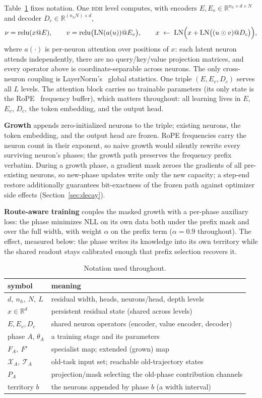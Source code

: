 \documentclass[11pt]{article}
\theoremstyle{definition}\newtheorem{definition}{Definition}
\theoremstyle{remark}\newtheorem{remark}{Remark}
\newcommand{\BDH}{\textsc{bdh}}
\newcommand{\Xa}{\mathcal{X}_A}
\newcommand{\TA}{\mathcal{T}_A}
\begin{document}
Table~\ref{tab:notation} fixes notation. One \BDH{} level computes, with encoders
$E,E_v\in\mathbb{R}^{n_h\times d\times N}$ and decoder $D_c\in\mathbb{R}^{(n_hN)\times d}$,
\[
\nu=\operatorname{relu}(x@E),\qquad
v=\operatorname{relu}\bigl(\operatorname{LN}(a(u))@E_v\bigr),\qquad
x \;\leftarrow\; \operatorname{LN}\Bigl(x+\operatorname{LN}\bigl((u\odot v)@D_c\bigr)\Bigr),
\]
where $a(\cdot)$ is per-neuron attention over positions of $x$: each latent neuron attends
independently, there are no query/key/value projection matrices, and every operator above is
coordinate-separable across neurons. The only cross-neuron coupling is LayerNorm's~\cite{layernorm} global
statistics. One triple $(E,E_v,D_c)$ serves all $L$ levels. The attention block carries no
trainable parameters (its only state is the RoPE~\cite{rope} frequency buffer), which matters throughout:
all learning lives in $E$, $E_v$, $D_c$, the token embedding, and the output head.

\textbf{Growth} appends zero-initialized neurons to the triple; existing neurons, the token
embedding, and the output head are frozen. RoPE frequencies carry the neuron count in their
exponent, so naive growth would silently rewrite every surviving neuron's phases; the
growth path preserves the frequency prefix verbatim. During a growth phase, a gradient mask
zeroes the gradients of all pre-existing neurons, so new-phase updates write only the new
capacity; a step-end restore additionally guarantees bit-exactness of the frozen path against
optimizer side effects (Section~\ref{sec:decay}).

\textbf{Route-aware training} couples the masked growth with a per-phase auxiliary loss:
the phase minimizes NLL on its own data both under the prefix mask and over the full width,
with weight $\alpha$ on the prefix term ($\alpha=0.9$ throughout). The effect, measured
below: the phase writes its knowledge into its own territory while the shared readout stays
calibrated enough that prefix selection recovers it.

\begin{table}[t]
\centering\small
\caption{Notation used throughout.}
\label{tab:notation}
\begin{tabular}{ll}
\toprule
symbol & meaning \\
\midrule
$d,\ n_h,\ N,\ L$ & residual width, heads, neurons/head, depth levels \\
$x\in\mathbb{R}^{d}$ & persistent residual state (shared across levels) \\
$E,E_v,D_c$ & shared neuron operators (encoder, value encoder, decoder) \\
phase $A$, $\theta_A$ & a training stage and its parameters \\
$F_A,\ F'$ & specialist map; extended (grown) map \\
$\Xa,\ \TA$ & old-task input set; reachable old-trajectory states \\
$P_A$ & projection/mask selecting the old-phase contribution channels \\
territory $b$ & the neurons appended by phase $b$ (a width interval) \\
\bottomrule
\end{tabular}
\end{table}
\end{document}
